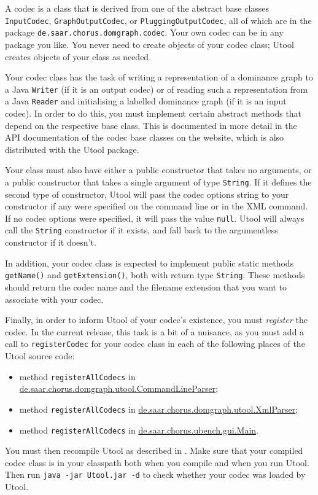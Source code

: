 A codec is a class that is derived from one of the abstract base
classes \verb?InputCodec?, \verb?GraphOutputCodec?, or
\verb?PluggingOutputCodec?, all of which are in the package
\verb?de.saar.chorus.domgraph.codec?. Your own codec can be in any
package you like. You never need to create objects of your codec
class; Utool creates objects of your class as needed.

Your codec class has the task of writing a representation of a
dominance graph to a Java \verb?Writer? (if it is an output codec) or
of reading such a representation from a Java \verb?Reader? and
initialising a labelled dominance graph (if it is an input codec). In
order to do this, you must implement certain abstract methods that
depend on the respective base class. This is documented in more detail
in the API documentation of the codec base classes on the website,
which is also distributed with the Utool package.

Your class must also have either a public constructor that takes no
arguments, or a public constructor that takes a single argument of
type \verb?String?. If it defines the second type of constructor,
Utool will pass the codec options string to your constructor if any
were specified on the command line or in the XML command. If no codec
options were specified, it will pass the value \verb?null?. Utool will
always call the \verb?String? constructor if it exists, and fall back
to the argumentless constructor if it doesn't.

In addition, your codec class is expected to implement public static
methods \verb?getName()? and \verb?getExtension()?, both with return
type \verb?String?. These methods should return the codec name and the
filename extension that you want to associate with your codec.

Finally, in order to inform Utool of your codec's existence, you must
\emph{register} the codec. In the current release, this task is a bit
of a nuisance, as you must add a call to \verb?registerCodec? for your
codec class in each of the following places of the Utool source code:
\begin{itemize}
\item method \verb?registerAllCodecs? in
  \url{de.saar.chorus.domgraph.utool.CommandLineParser};
\item method \verb?registerAllCodecs? in
  \url{de.saar.chorus.domgraph.utool.XmlParser};
\item method \verb?registerAllCodecs? in
  \url{de.saar.chorus.ubench.gui.Main}. 
\end{itemize}

You must then recompile Utool as described in . Make sure
that your compiled codec class is in your classpath both when you
compile and when you run Utool. Then run \verb?java -jar Utool.jar -d?
to check whether your codec was loaded by Utool.







